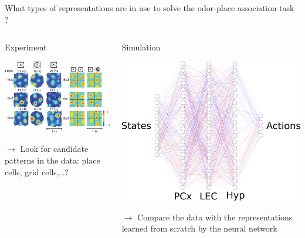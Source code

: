 \documentclass[bigger]{beamer}
\begin{document}
\begin{frame}[label={sec:orgc8b79f6}]{What types of representations are in use to solve the odor-place association task ?}
\begin{columns}
\begin{column}[t]{0.5\columnwidth}
\begin{center}
Experiment
\end{center}
\begin{center}
\includegraphics[height=0.25\textheight]{img/place-cells-grid-cells.jpg.png}
\end{center}
\(\to\) Look for candidate patterns in the data: place cells, grid cells,\dots{}?
\end{column}
\begin{column}[t]{0.5\columnwidth}
\begin{center}
Simulation
\end{center}
\begin{center}
\includegraphics[height=0.25\textheight]{img/nn.svg.png}
\end{center}
\(\to\) Compare the data with the representations learned from scratch by the neural network


\end{column}
\end{columns}
\end{frame}
\end{document}

